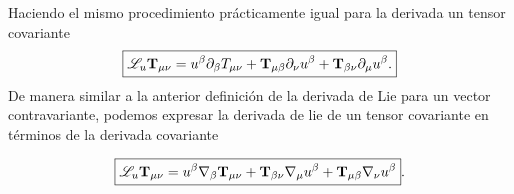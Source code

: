 \noindent Haciendo el mismo procedimiento prácticamente igual  para la derivada un tensor covariante 
\begin{equation}
    \boxed{\mathscr{L}_u {\mathbf{T}}_{\mu \nu} = u^\beta \partial_\beta T_{\mu \nu}   +  {\mathbf{T}}_{\mu \beta } \partial_\nu u^\beta  + {\mathbf{T}}_{ \beta \nu} \partial_\mu u^\beta.}
\end{equation}
De manera similar a la anterior definición de la derivada de Lie para un vector contravariante, podemos expresar la derivada de lie de un tensor covariante en términos de la derivada covariante 

\begin{equation}
    \boxed{\mathscr{L}_u {\mathbf{T}}_{\mu \nu} = u^\beta \mathbf{\nabla}_\beta {\ensuremath{\mathbf{T}}}_{\mu \nu}+{\mathbf{T}}_{\beta \nu}\mathbf{\nabla}_\mu u^\beta +{\mathbf{T}}_{\mu \beta } \mathbf{\nabla}_\nu u^\beta}.
\end{equation}

